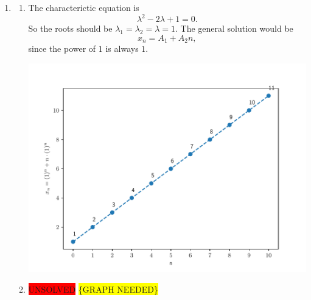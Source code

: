 \documentclass[
    classnum=MATH564,
    classname=MATHEMATICAL\ MODELING,
    due=January\ 28\,\ 2020,
    author=Gabrielle\ Streeter\qquad Hannah\ Wu\qquad\ Minghang\ Li,
    authorshort=Streeter\ \&\ Wu\ \&\ Li,
    teacher= Zachary\ M.\ Boyd,
    hw=1
]{hw-template}
\newcommand{\requiregraph}{\colorbox{yellow}{\{GRAPH NEEDED\}}}
\newenvironment{Figure}
  {\par\medskip\noindent\minipage{\linewidth}}
  {\endminipage\par\medskip}
\begin{document}
\begin{homeworkProblem}
\begin{enumerate}
    \pagebreak
    \item \begin{enumerate}[label=(\roman*)]
    \addtocounter{enumii}{1}
        \item The characterictic equation is \[
            \lambda^2 - 2\lambda + 1 = 0.
        \]
        So the roots should be $\lambda_1 = \lambda_2 = \lambda = 1$.
        The general solution would be \[
            x_n = A_1 + A_2 n,
        \] since the power of $1$ is always $1$.
        \begin{Figure}
            \centering
            \includegraphics[scale=0.5]{media/hw1/fig3(b)(ii).pdf}
        \end{Figure}

        \item \colorbox{red}{UNSOLVED}
        \requiregraph
    \end{enumerate}
\end{enumerate}
\end{homeworkProblem}

\pagebreak
\end{document}
